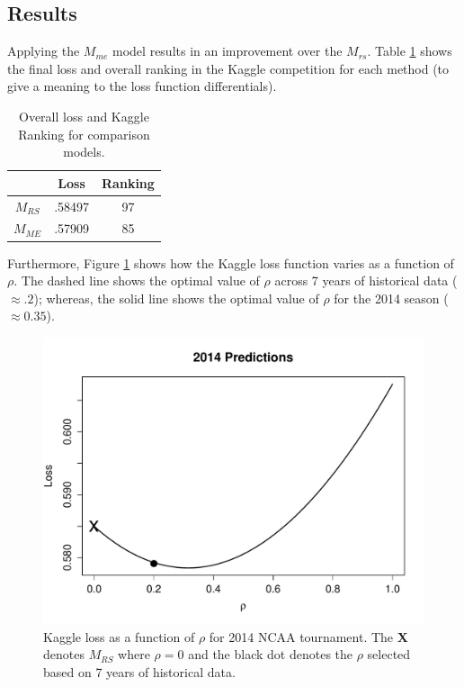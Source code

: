 \documentclass[letterpaper,12pt]{article}
\begin{document}
 \subsection{Results}
Applying the $M_{me}$ model results in an improvement over the $M_{rs}$. Table \ref{tab:results} shows the final loss and overall ranking in the Kaggle competition for each method (to give a meaning to the loss function differentials).
\begin{table}[h!]
\caption{Overall loss and Kaggle Ranking for comparison models.\label{tab:results}}
\centering
\begin{tabular}{|c|cc|}
  \hline
    & Loss & Ranking\\ 
  \hline
  $M_{RS}$ & .58497 & 97 \\
  $M_{ME}$ & .57909 & 85 \\
   \hline
   \hline
\end{tabular}
\end{table}
Furthermore, Figure \ref{fig:result} shows how the Kaggle loss function varies as a function of $\rho$. The dashed line shows the optimal value of $\rho$ across 7 years of historical data ($\approx .2$); whereas, the solid line shows the optimal value of $\rho$ for the 2014 season ($\approx 0.35$). 
\begin{figure}[h!]
\centering
\includegraphics[width=.8\textwidth]{Predictions.pdf}
\caption{Kaggle loss as a function of $\rho$ for 2014 NCAA tournament. The {\bf X} denotes $M_{RS}$ where $\rho = 0$ and the black dot denotes the $\rho$ selected based on 7 years of historical data.}
\label{fig:result}
\end{figure} 
\end{document}
